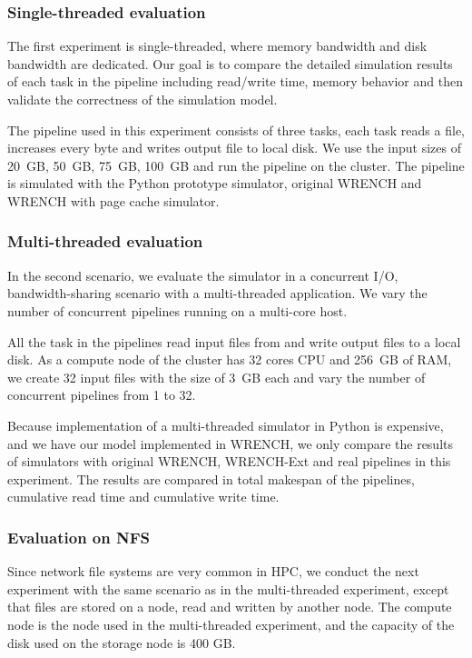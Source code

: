 \documentclass[conference]{IEEEtran}
\begin{document}
			\subsubsection{Single-threaded evaluation}
			
			The first experiment is single-threaded, where memory bandwidth 
			and disk bandwidth are dedicated. 
			Our goal is to compare the detailed simulation results of each task 
			in the pipeline including read/write time, memory behavior and 
			then validate the correctness of the simulation model. 

			The pipeline used in this experiment consists of three tasks, 
			each task reads a file, increases every byte and writes output file 
			to local disk. 
			We use the input sizes of 20~GB, 50~GB, 75~GB, 100~GB and run 
			the pipeline on the cluster.
			The pipeline is simulated with the Python prototype simulator, 
			original WRENCH and WRENCH with page cache simulator. 
			
			\subsubsection{Multi-threaded evaluation}

			In the second scenario, we evaluate the simulator in a concurrent I/O, 
			bandwidth-sharing scenario with a multi-threaded application. 			
			We vary the number of concurrent pipelines running on a multi-core host.  
			
			All the task in the pipelines read input files from and write output files 
			to a local disk. 
			As a compute node of the cluster has 32 cores CPU and 256~GB of RAM,  
			we create 32 input files with the size of 3~GB each and vary the number of 
			concurrent pipelines from 1 to 32. 
			
			Because implementation of a multi-threaded simulator in Python is 
			expensive, and we have our model implemented in WRENCH, 
			we only compare the results of simulators with original WRENCH, 
			WRENCH-Ext and real pipelines in this experiment. 
			The results are compared in total makespan of the pipelines, 
			cumulative read time and cumulative write time.
			
			\subsubsection{Evaluation on NFS}
			
		    Since network file systems are very common in HPC, we conduct 
		    the next experiment with the same scenario as in the multi-threaded experiment, 
		    except that files are stored on a node, read and written by another node. 
		    The compute node is the node used in the multi-threaded experiment, 
		    and the capacity of the disk used on the storage node is 400 GB.
		    
\end{document}

